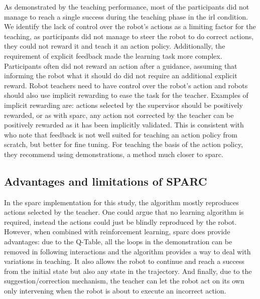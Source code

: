 As demonstrated by the teaching performance, most of the participants did not manage to reach a single success during the teaching phase in the \gls{irl} condition. We identify the lack of control over the robot's actions as a limiting factor for the teaching, as participants did not manage to steer the robot to do correct actions, they could not reward it and teach it an action policy. Additionally, the requirement of explicit feedback made the learning task more complex. Participants often did not reward an action after a guidance, assuming that informing the robot what it should do did not require an additional explicit reward. Robot teachers need to have control over the robot's action and robots should also use implicit rewarding to ease the task for the teacher. Examples of implicit rewarding are: actions selected by the supervisor should be positively rewarded, or as with \gls{sparc}, any action not corrected by the teacher can be positively rewarded as it has been implicitly validated. This is consistent with \cite{kaochar2011towards} who note that feedback is not well suited for teaching an action policy from scratch, but better for fine tuning. For teaching the basis of the action policy, they recommend using demonstrations, a method much closer to \gls{sparc}. 

\subsection{Advantages and limitations of SPARC}

In the \gls{sparc} implementation for this study, the algorithm mostly reproduces actions selected by the teacher. One could argue that no learning algorithm is required, instead the actions could just be blindly reproduced by the robot. However, when combined with reinforcement learning, \gls{sparc} does provide advantages: due to the Q-Table, all the loops in the demonstration can be removed in following interactions and the algorithm provides a way to deal with variations in teaching. It also allows the robot to continue and reach a success from the initial state but also any state in the trajectory. And finally, due to the suggestion/correction mechanism, the teacher can let the robot act on its own only intervening when the robot is about to execute an incorrect action. 


